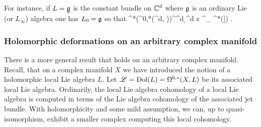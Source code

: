 \documentclass[10pt]{amsart}
\begin{document}
For instance, if $L = \underline{\mathfrak g}$ is the constant bundle on $\mathbb C^d$ where $\mathfrak g$ is an ordinary Lie (or $L_\infty$) algebra one has $L_0 = \mathfrak g$ so that
\ben
\cloc^*(\Omega^{0,*}(\CC^d, \fg))^{\CC^d} \simeq \CC \cdot \d^d z \tensor^{\LL}_{} \cred^*(\fg [[z_1,\ldots,z_d]]) .
\een

\subsubsection{Holomorphic deformations on an arbitrary complex manifold}

There is a more general result that holds on an arbitrary complex manifold. 
Recall, that on a complex manifold $X$ we have introduced the notion of a holomorphic local Lie algebra $L$. 
Let $\mathscr L = {\rm Dol}(L) = \Omega^{0,*}(X , L)$ be its associated local Lie algebra. 
Ordinarily, the local Lie algebra cohomology of a local Lie algebra is computed in terms of the Lie algebra cohomology of the associated jet bundle. 
With holomorphicity and some mild assumption, we can, up to quasi-isomorphism, exhibit a smaller complex computing this local cohomology. 
\end{document}
